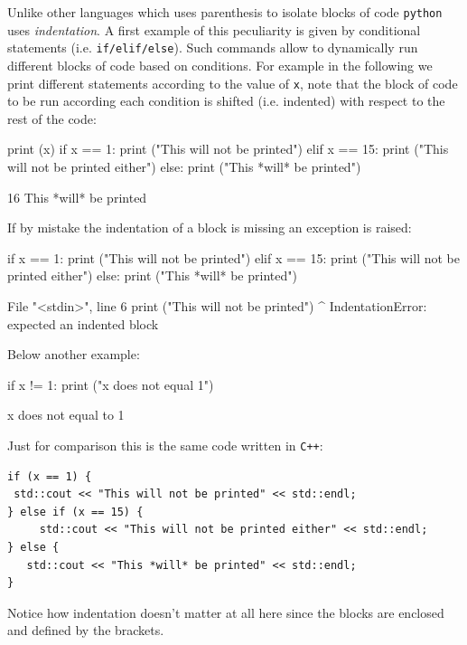 Unlike other languages which uses parenthesis to isolate blocks of code \texttt{python} uses \emph{indentation}. A first example of this peculiarity is given by conditional statements (i.e. \texttt{if/elif/else}). Such commands allow to dynamically run different blocks of code based on conditions. For example in the following we print different statements according to the value of \texttt{x}, note that the block of code to be run according each condition is shifted (i.e. indented) with respect to the rest of the code:

\begin{ipythonnon}
print (x)
if x == 1:
	print ("This will not be printed")
elif x == 15:
	print ("This will not be printed either")
else:
	print ("This *will* be printed")
\end{ipythonnon}
\begin{ioutput}
16
This *will* be printed	
\end{ioutput}

If by mistake the indentation of a block is missing an exception is raised:

\begin{ipythonnon}
if x == 1:
    print ("This will not be printed")
elif x == 15:
    print ("This will not be printed either")
else:
   print ("This *will* be printed")
\end{ipythonnon}
\begin{ioutput}
  File "<stdin>", line 6
    print ("This will not be printed")
        ^
IndentationError: expected an indented block
\end{ioutput}

Below another example:
\begin{ipythonnon}
if x != 1:
    print ("x does not equal 1")
\end{ipythonnon}
\begin{ioutput}
x does not equal to 1	
\end{ioutput}

Just for comparison this is the same code written in \texttt{C++}:

\begin{lstlisting}[style=mycpp]
if (x == 1) {
 std::cout << "This will not be printed" << std::endl;
} else if (x == 15) {
     std::cout << "This will not be printed either" << std::endl;
} else {
   std::cout << "This *will* be printed" << std::endl;
}
\end{lstlisting}

Notice how indentation doesn't matter at all here since the blocks are enclosed and defined by the brackets.

